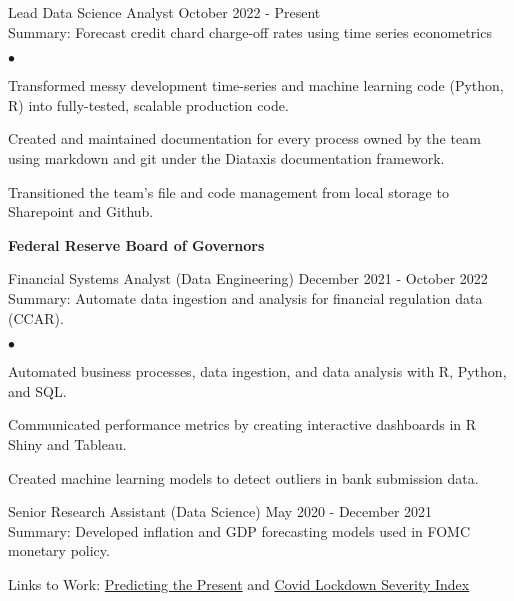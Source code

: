 \documentclass[margin, line]{res}
\newenvironment{list2}{
  \begin{list}{$\bullet$}{%
      \setlength{\itemsep}{0.04in}
      \setlength{\parsep}{0in} \setlength{\parskip}{0in}
      \setlength{\topsep}{0.05in} \setlength{\partopsep}{0in} 
      \setlength{\leftmargin}{\dimexpr 26pt-0.05in}}}
    {\end{list}}
\begin{document}
\begin{resume}
\vspace{-.65cm}
Lead Data Science Analyst \hfill October 2022 - Present\\
\hspace*{3mm} 
    Summary: Forecast credit chard charge-off rates using time series econometrics
\hspace*{3mm}
    \begin{list2}
        \item Transformed messy development time-series and machine learning code (Python, R) into fully-tested, scalable production code.
        \item Created and maintained documentation for every process owned by the team using markdown and git under the Diataxis documentation framework.
        \item Transitioned the team's file and code management from local storage to Sharepoint and Github.
    \end{list2}

{\bf Federal Reserve Board of Governors}\\

\vspace{-.65cm}

Financial Systems Analyst (Data Engineering) \hfill December 2021 - October 2022\\
\hspace*{3mm} 
    Summary: Automate data ingestion and analysis for financial regulation data (CCAR).
\hspace*{3mm}
    \begin{list2}
        \item Automated business processes, data ingestion, and data analysis with R, Python, and SQL.
        \item Communicated performance metrics by creating interactive dashboards in R Shiny and Tableau.
        \item Created machine learning models to detect outliers in bank submission data.
    \end{list2}


Senior Research Assistant (Data Science) \hfill May 2020 - December 2021 \\
\hspace*{3mm}
    Summary: Developed inflation and GDP forecasting models used in FOMC monetary policy.
\vspace{-3mm}

\hspace*{3mm}
    Links to Work:  \href{https://michaelboerman.medium.com/predicting-the-present-a56ff704af0b}{Predicting the Present} and   \href{https://github.com/michaelboerman/lockdown_severity_index#readme}{Covid Lockdown Severity Index}
    

\end{resume}
\end{document}
